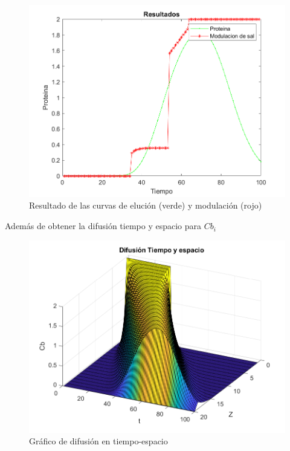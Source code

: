 \begin{figure}[!ht]
	\centering
	\includegraphics[scale=0.6]{Imagenes/resultado1.png}
	\caption{Resultado de las curvas de elución (verde) y modulación (rojo)}
	\label{fig:ej}
\end{figure}

\par Además de obtener la difusión tiempo y espacio para $Cb_{i}$

\begin{figure}[!ht]
	\centering
	\includegraphics[scale=0.7]{Imagenes/grafico3d.png}
	\caption{Gráfico de difusión en tiempo-espacio}
	\label{fig:ej}
\end{figure}

